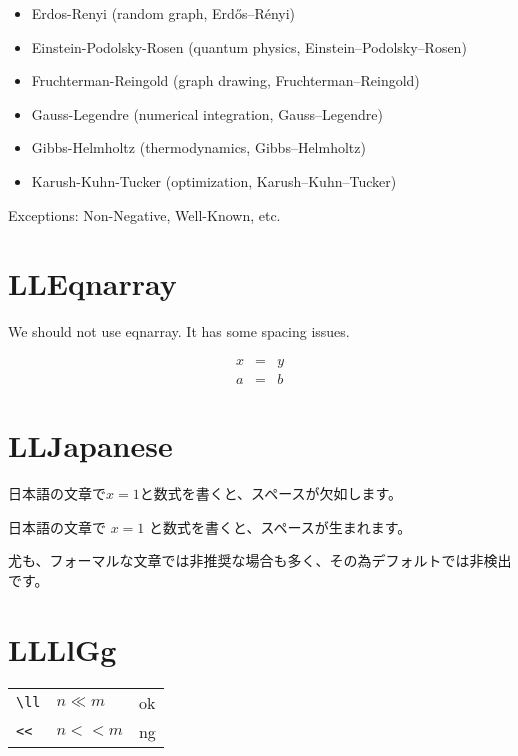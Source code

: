\documentclass[a4paper]{article}
\newcommand{\tA}[1]{\textcolor{cA}{#1}}
\newcommand{\tD}[1]{\textcolor{cD}{#1}}
\begin{document}
\begin{itemize}
	\item Erdos-Renyi (random graph, Erd\H{o}s--R\'enyi)
	\item Einstein-Podolsky-Rosen (quantum physics, Einstein--Podolsky--Rosen)
	\item Fruchterman-Reingold (graph drawing, Fruchterman--Reingold)
	\item Gauss-Legendre (numerical integration, Gauss--Legendre)
	\item Gibbs-Helmholtz (thermodynamics, Gibbs--Helmholtz)
	\item Karush-Kuhn-Tucker (optimization, Karush--Kuhn--Tucker)
\end{itemize}

Exceptions: Non-Negative,  Well-Known, etc.


\section{LLEqnarray}

We should not use eqnarray. It has some spacing issues.

\begin{eqnarray*}
	x & = & y \\
	a & = & b
\end{eqnarray*}

\section{LLJapanese}

\begin{CJK}{UTF8}{ipxm}
	日本語の文章で$x=1$と数式を書くと、スペースが欠如します。

	日本語の文章で $x=1$ と数式を書くと、スペースが生まれます。

	尤も、フォーマルな文章では非推奨な場合も多く、その為デフォルトでは非検出です。
\end{CJK}

\section{LLLlGg}

\begin{table}[H]
	\centering
	\begin{tabular}{lll}
		\verb|\ll| & $n\ll m$ & \tA{ok} \\
		\verb|<<|  & $n << m$ & \tD{ng} \\
	\end{tabular}
\end{table}
\end{document}
